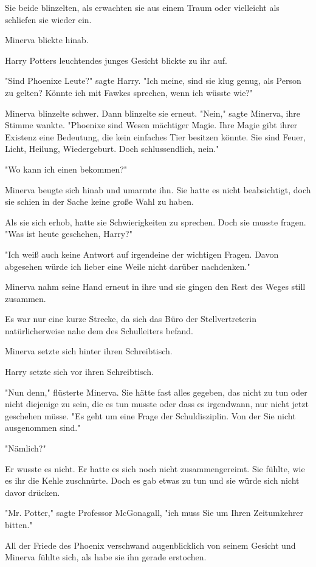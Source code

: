 {Sie beide blinzelten, als erwachten sie aus einem Traum oder vielleicht als schliefen sie wieder ein.

Minerva blickte hinab.

Harry Potters leuchtendes junges Gesicht blickte zu ihr auf.

"Sind Phoenixe Leute?" sagte Harry. "Ich meine, sind sie klug genug, als Person zu gelten? Könnte ich mit Fawkes sprechen, wenn ich wüsste wie?"

Minerva blinzelte schwer. Dann blinzelte sie erneut. "Nein," sagte Minerva, ihre Stimme wankte. "Phoenixe sind Wesen mächtiger Magie. Ihre Magie gibt ihrer Existenz eine Bedeutung, die kein einfaches Tier besitzen könnte. Sie sind Feuer, Licht, Heilung, Wiedergeburt. Doch schlussendlich, nein."

"Wo kann ich einen bekommen?"

Minerva beugte sich hinab und umarmte ihn. Sie hatte es nicht beabsichtigt, doch sie schien in der Sache keine große Wahl zu haben.

Als sie sich erhob, hatte sie Schwierigkeiten zu sprechen. Doch sie musste fragen. "Was ist heute geschehen, Harry?"

"Ich weiß auch keine Antwort auf irgendeine der wichtigen Fragen. Davon abgesehen würde ich lieber eine Weile nicht darüber nachdenken."

Minerva nahm seine Hand erneut in ihre und sie gingen den Rest des Weges still zusammen.

Es war nur eine kurze Strecke, da sich das Büro der Stellvertreterin natürlicherweise nahe dem des Schulleiters befand.

Minerva setzte sich hinter ihren Schreibtisch.

Harry setzte sich vor ihren Schreibtisch.

"Nun denn," flüsterte Minerva. Sie hätte fast alles gegeben, das nicht zu tun oder nicht diejenige zu sein, die es tun musste oder dass es irgendwann, nur nicht jetzt geschehen müsse. "Es geht um eine Frage der Schuldisziplin. Von der Sie nicht ausgenommen sind."

"Nämlich?"

Er wusste es nicht. Er hatte es sich noch nicht zusammengereimt. Sie fühlte, wie es ihr die Kehle zuschnürte. Doch es gab etwas zu tun und sie würde sich nicht davor drücken.

"Mr. Potter," sagte Professor McGonagall, "ich muss Sie um Ihren Zeitumkehrer bitten."

All der Friede des Phoenix verschwand augenblicklich von seinem Gesicht und Minerva fühlte sich, als habe sie ihn gerade erstochen.

}
